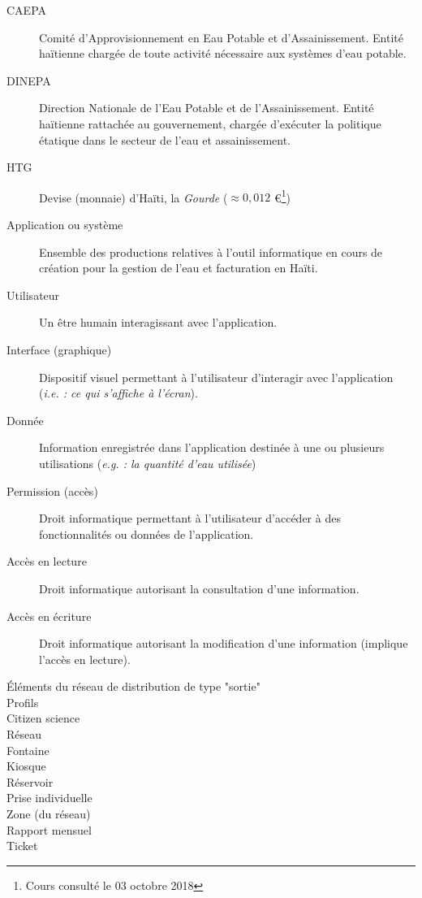 \documentclass[a4paper, 11pt]{article}
\begin{document}
  \begin{description} %
    \item[CAEPA] Comité d'Approvisionnement en Eau Potable et d'Assainissement. Entité haïtienne chargée de toute activité nécessaire aux systèmes d'eau potable.
    \item[DINEPA] Direction Nationale de l'Eau Potable et de l'Assainissement. Entité haïtienne rattachée au gouvernement, chargée d'exécuter la politique étatique dans le secteur de l'eau et assainissement.
    \item[HTG] Devise (monnaie) d'Haïti, la \emph{Gourde} ($\approx 0,012$ \euro \footnote{Cours consulté le 03 octobre 2018})
    \item[Application ou système] Ensemble des productions relatives à l'outil informatique en cours de création pour la gestion de l'eau et facturation en Haïti.
    \item[Utilisateur] Un être humain interagissant avec l'application.
    \item[Interface (graphique)] Dispositif visuel permettant à l'utilisateur d'interagir avec l'application (\emph{i.e. : ce qui s'affiche à l'écran}).
    \item[Donnée] Information enregistrée dans l'application destinée à une ou plusieurs utilisations (\emph{e.g. : la quantité d'eau utilisée})
    \item[Permission (accès)] Droit informatique permettant à l'utilisateur d'accéder à des fonctionnalités ou données de l'application.
    \item[Accès en lecture] Droit informatique autorisant la consultation d'une information.
    \item[Accès en écriture] Droit informatique autorisant la modification d'une information (implique l'accès en lecture).
    \item[Éléments du réseau de distribution de type "sortie"] %
    \item[Profils]
    \item[Citizen science]
    \item[Réseau]
    \item[Fontaine]
    \item[Kiosque]
    \item[Réservoir]
    \item[Prise individuelle]
    \item[Zone (du réseau)]
    \item[Rapport mensuel]
    \item[Ticket]
  \end{description}
\end{document}
